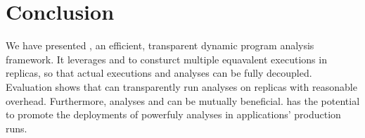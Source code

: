 \section{Conclusion} \label{sec:conclusion}

We have presented \xxx, an efficient, transparent dynamic program analysis 
framework. It leverages \smr and \dmt to consturct multiple equavalent 
executions in replicas, so that actual executions and analyses can be fully 
decoupled. Evaluation shows that \xxx can transparently run analyses on 
replicas with reasonable overhead. Furthermore, analyses and \xxx can be 
mutually beneficial. \xxx has the potential to promote the deployments of 
powerfuly analyses in applications' production runs.
